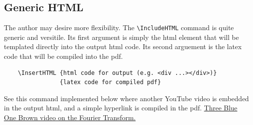 \documentclass{article}
\begin{document}

\subsection{Generic HTML}
The author may desire more flexibility. The \verb'\IncludeHTML' command is quite generic and versitile. Its first argument is simply the html element that will be templated directly into the output html code. Its second arguement is the latex code that will be compiled into the pdf.   
\begin{verbatim}
    \InsertHTML {html code for output (e.g. <div ...></div>)}
                {latex code for compiled pdf}
\end{verbatim}  

See this command implemented below where another YouTube video is embedded in the output html, and a simple hyperlink is compiled in the pdf. 
           {\href{https://www.youtube.com/embed/spUNpyF58BY?si=wW31fiDuXUkdEAQn}{Three Blue One Brown video on the Fourier Transform.}}




\end{document}
